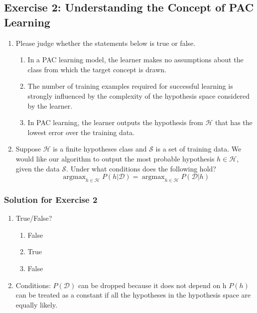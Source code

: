 \subsection{Exercise 2:  Understanding the Concept of PAC Learning}
\begin{enumerate}
    \item Please judge whether the statements below is true or false.
\begin{enumerate}
    \item  In a PAC learning model, the learner makes no assumptions about the class from which the target concept is drawn. 
    \item The number of training examples required for successful learning is strongly influenced by the complexity of the hypothesis space considered by the learner.
    \item In PAC learning, the learner outputs the hypothesis from $\mathcal{H}$ that has the lowest error over the training data.
\end{enumerate}
    \item Suppose $\mathcal{H}$ is a finite hypotheses class and $\mathcal{S}$ is a set of training data. We would like our algorithm to output the most probable hypothesis $h \in \mathcal{H}$, given the data  $\mathcal{S}$. Under what conditions does the following hold?
    \begin{equation*}
        \operatorname{argmax}_{h \in \mathcal{H}}P(h|\mathcal{D}) = \operatorname{argmax}_{h \in \mathcal{H}}P(\mathcal{D}|h)
    \end{equation*}
\end{enumerate}

\subsubsection{Solution for Exercise 2}
\begin{enumerate}
    \item True/False?
    \begin{enumerate}
    \item False
    \item True
    \item False
\end{enumerate}
    \item Conditions: $P(\mathcal{D})$ can be dropped because it does not depend on h
$P(h)$ can be treated as a constant if all the hypotheses in the hypothesis space are equally likely.

\end{enumerate}






